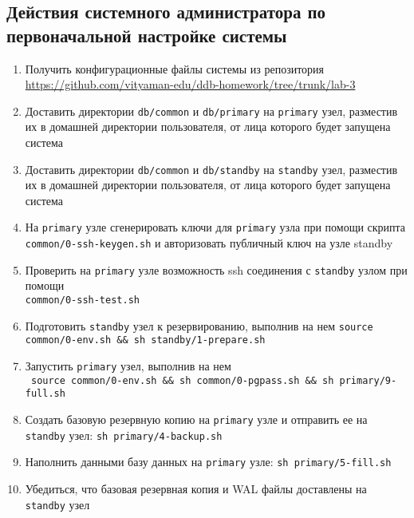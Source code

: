 \documentclass{article}
\begin{document}
\subsection{Действия системного администратора по первоначальной настройке системы}

\begin{enumerate}
    \item Получить конфигурационные файлы системы из репозитория \\
    \url{https://github.com/vityaman-edu/ddb-homework/tree/trunk/lab-3}

    \item Доставить директории \texttt{db/common} и \texttt{db/primary} на \texttt{primary} узел, разместив их в домашней директории пользователя, от лица которого будет запущена система
    
    \item Доставить директории \texttt{db/common} и \texttt{db/standby} на \texttt{standby} узел, разместив их в домашней директории пользователя, от лица которого будет запущена система
    
    \item На \texttt{primary} узле сгенерировать ключи для \texttt{primary} узла при помощи скрипта \\ \texttt{common/0-ssh-keygen.sh} и авторизовать публичный ключ на узле standby 
    
    \item Проверить на \texttt{primary} узле возможность ssh соединения с \texttt{standby} узлом при помощи \\ \texttt{common/0-ssh-test.sh}
    
    \item Подготовить \texttt{standby} узел к резервированию, выполнив на нем \texttt{source common/0-env.sh \&\& sh standby/1-prepare.sh}
    
    \item Запустить \texttt{primary} узел, выполнив на нем \\
    \texttt{
        source common/0-env.sh \&\& 
        sh common/0-pgpass.sh \&\& 
        sh primary/9-full.sh}

    \item Создать базовую резервную копию на \texttt{primary} узле и отправить ее на \texttt{standby} узел: \texttt{sh primary/4-backup.sh}
    
    \item Наполнить данными базу данных на \texttt{primary} узле:
    \texttt{sh primary/5-fill.sh}

    \item Убедиться, что базовая резервная копия и WAL файлы доставлены на \texttt{standby} узел

\end{enumerate}
\end{document}
